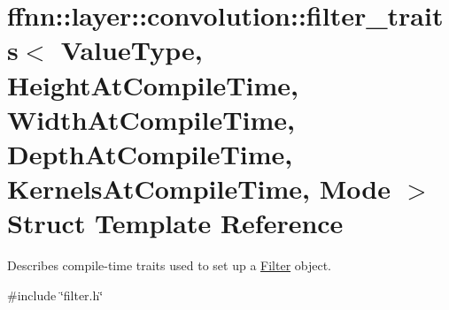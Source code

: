 \hypertarget{structffnn_1_1layer_1_1convolution_1_1filter__traits}{\section{ffnn\-:\-:layer\-:\-:convolution\-:\-:filter\-\_\-traits$<$ Value\-Type, Height\-At\-Compile\-Time, Width\-At\-Compile\-Time, Depth\-At\-Compile\-Time, Kernels\-At\-Compile\-Time, Mode $>$ Struct Template Reference}
\label{structffnn_1_1layer_1_1convolution_1_1filter__traits}
}


Describes compile-\/time traits used to set up a \hyperlink{structffnn_1_1layer_1_1convolution_1_1_filter}{Filter} object.  




{\ttfamily \#include \char`\"{}filter.\-h\char`\"{}}


